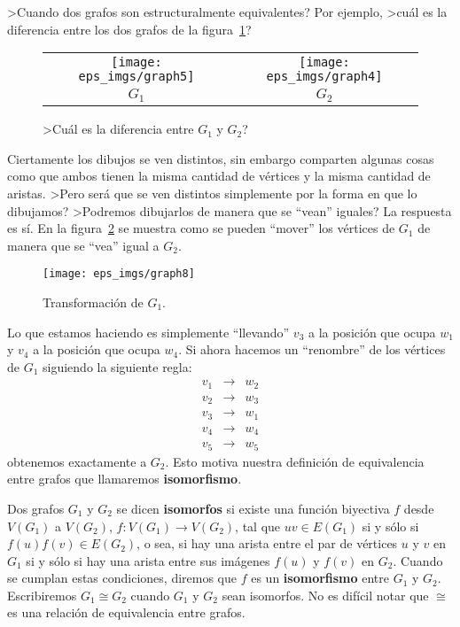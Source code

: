 >Cuando dos grafos son estructuralmente equivalentes?
Por ejemplo, >cuál es la diferencia entre los dos grafos de la figura~\ref{fig:compare-graph}?
\begin{figure}[t!]
\centering
\begin{tabular}{cc}
\texttt{[image: eps\_imgs/graph5]}\hspace*{3em} & \hspace*{3em}\texttt{[image: eps\_imgs/graph4]} \\
$G_1$ \hspace*{3em} & \hspace*{3em} $G_2$
\end{tabular}
\caption{>Cuál es la diferencia entre $G_1$ y $G_2$?}
\label{fig:compare-graph}
\end{figure}
Ciertamente los dibujos se ven distintos, sin embargo comparten algunas cosas como que ambos tienen la misma cantidad de vértices y la misma cantidad de aristas.
>Pero será que se ven distintos simplemente por la forma en que lo dibujamos?
>Podremos dibujarlos de manera que se ``vean'' iguales?
La respuesta es sí.
En la figura~\ref{fig:transform} se muestra como se pueden ``mover'' los vértices de $G_1$ de manera que se ``vea'' igual a $G_2$.
\begin{figure}[t!]
\centering
\texttt{[image: eps\_imgs/graph8]}\\
\caption{Transformación de $G_1$.}
\label{fig:transform}
\end{figure}
Lo que estamos haciendo es simplemente ``llevando'' $v_3$ a la posición que ocupa $w_1$ y $v_4$ a la posición que ocupa $w_4$.
Si ahora hacemos un ``renombre'' de los vértices de $G_1$ siguiendo la siguiente regla:
\[
\begin{array}{ccc}
v_1 & \rightarrow & w_2 \\
v_2 & \rightarrow & w_3 \\
v_3 & \rightarrow & w_1 \\
v_4 & \rightarrow & w_4 \\
v_5 & \rightarrow & w_5
\end{array}
\]
obtenemos exactamente a $G_2$.
Esto motiva nuestra definición de equivalencia entre grafos que llamaremos {\bf isomorfismo}.

\begin{definicion}
Dos grafos $G_1$ y $G_2$ se dicen {\bf isomorfos} si existe una función biyectiva $f$ desde $V(G_1)$ a $V(G_2)$, $f:V(G_1)\rightarrow V(G_2)$, tal que $uv\in E(G_1)$ si y sólo si $f(u)f(v)\in E(G_2)$, o sea, si hay una arista entre el par de vértices $u$ y $v$ en $G_1$ si y sólo si hay una arista entre sus imágenes $f(u)$ y $f(v)$ en $G_2$.
Cuando se cumplan estas condiciones, diremos que $f$ es un {\bf isomorfismo} entre $G_1$ y $G_2$.
Escribiremos $G_1\cong G_2$ cuando $G_1$ y $G_2$ sean isomorfos.
No es difícil notar que $\cong$ es una relación de equivalencia entre grafos.
\end{definicion}

